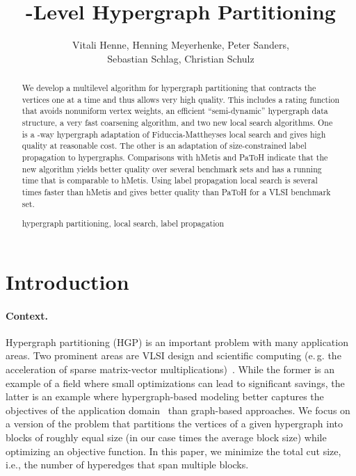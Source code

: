 \documentclass[runningheads,a4paper]{llncs}
\newcommand{\keywords}[1]{\par\addvspace\baselineskip
\noindent\keywordname\enspace\ignorespaces#1}
\newcommand{\eg}{e.\,g.\xspace}
\begin{document}
\npthousandsep{\ }
 \mainmatter  


\title{-Level Hypergraph Partitioning}


\author{Vitali Henne,
  Henning Meyerhenke,
  Peter Sanders,\\ 
  Sebastian Schlag,
  Christian Schulz}




\maketitle


\begin{abstract}
We develop a multilevel algorithm for hypergraph partitioning that contracts the vertices one at a time and thus allows very high quality. This includes a rating function that avoids nonuniform vertex weights, an efficient ``semi-dynamic'' hypergraph data structure, a very fast coarsening algorithm, and two new local search algorithms. One is a -way hypergraph adaptation of Fiduccia-Mattheyses local search and gives high quality at reasonable cost. The other is an adaptation of size-constrained label propagation to hypergraphs. Comparisons with hMetis and PaToH indicate that the new algorithm yields better quality over several benchmark sets and has a running time that is comparable to hMetis. Using label propagation local search is several times faster than hMetis and gives better quality than PaToH for a VLSI benchmark set. 

\keywords{hypergraph partitioning, local search, label propagation}
\end{abstract}


\section{Introduction} \label{Introduction}
\paragraph{Context.}
Hypergraph partitioning (HGP) is an important problem with many application areas. Two prominent areas are 
VLSI design and scientific computing (\eg the acceleration of sparse matrix-vector multiplications)~\cite{Papa2007}.
While the former is an example of a field where small optimizations can lead to significant savings, the latter
is an example where hypergraph-based modeling better captures the objectives of the 
application domain~\cite{PaToH} than graph-based approaches. We focus on a version of the problem that partitions the vertices of a given
hypergraph into  blocks of roughly equal size (in our case  times the average block size) while optimizing
an objective function. In this paper, we minimize the total cut size, i.e., the number of hyperedges that span multiple blocks.
\end{document}
